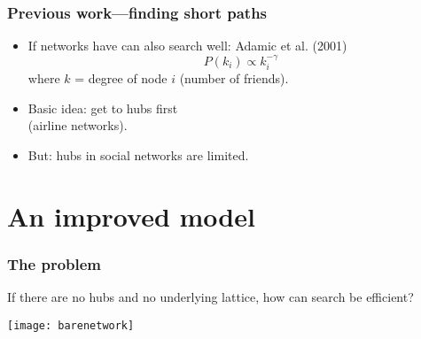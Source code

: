 \begin{frame}
  \frametitle{Previous work---finding short paths}

  \begin{itemize}
  \item<1-> 
    If networks have  can 
    also search well: Adamic et al. (2001)\cite{adamic2001a}
    $$ P(k_i) \propto k_i^{-\gamma}$$
    where $k$ = degree of node $i$ (number of friends).
  \item<2->
    Basic idea: get to hubs first\\
    (airline networks).
  \item<3->   
    \alert{But: hubs in social networks are limited.}
\end{itemize}
  
\end{frame}

\section{An improved model}

\begin{frame}
  \frametitle{The problem}

  If there are no hubs and no underlying lattice,
  how can search be efficient?

  \texttt{[image: barenetwork]}%

\end{frame}



